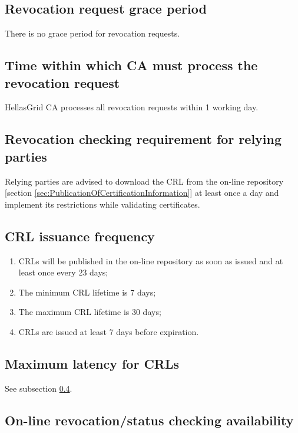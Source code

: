 \subsection{Revocation request grace period}

There is no grace period for revocation requests.

\subsection{Time within which CA must process the revocation request}

HellasGrid CA processes all revocation requests within 1 working day.

\subsection{Revocation checking requirement for relying parties}

Relying parties are advised to download the CRL from the on-line repository [section \ref{sec:PublicationOfCertificationInformation}] at least once a day and implement its restrictions while validating certificates.

\subsection{CRL issuance frequency}
\label{sub:CRLIssuanceFrequency}

\begin{enumerate}
\item{CRLs will be published in the on-line repository as soon as issued and at least once every 23 days;}
\item{The minimum CRL lifetime is 7 days;}
\item{The maximum CRL lifetime is 30 days;}
\item{CRLs are issued at least 7 days before expiration.}
\end{enumerate}

\subsection{Maximum latency for CRLs}

See subsection \ref{sub:CRLIssuanceFrequency}.

\subsection{On-line revocation/status checking availability}


